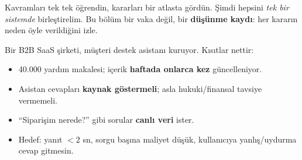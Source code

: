 

Kavramları tek tek öğrendin, kararları bir atlasta gördün. Şimdi hepsini
\emph{tek bir sistemde} birleştirelim. Bu bölüm bir vaka değil, bir
\textbf{düşünme kaydı}: her kararın neden öyle verildiğini izle.

Bir B2B SaaS şirketi, müşteri destek asistanı kuruyor. Kısıtlar nettir:
\begin{itemize}
  \item 40.000 yardım makalesi; içerik \textbf{haftada onlarca kez} güncelleniyor.
  \item Asistan cevapları \textbf{kaynak göstermeli}; asla hukuki/finansal tavsiye vermemeli.
  \item ``Siparişim nerede?'' gibi sorular \textbf{canlı veri} ister.
  \item Hedef: yanıt $<2$ sn, sorgu başına maliyet düşük, kullanıcıya yanlış/uydurma cevap gitmesin.
\end{itemize}

